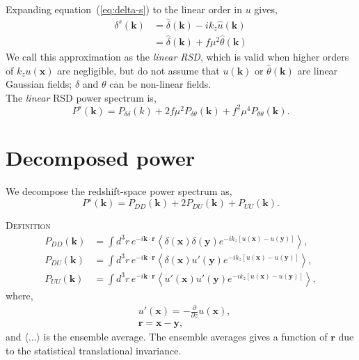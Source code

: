 \documentclass[a4paper,11pt, fleqn]{article}
\begin{document}
Expanding equation~(\ref{eq:delta-s}) to the linear order in $u$ gives,
%
\begin{align}
  \delta^s(\bm{k}) &= \hat{\delta}(\bm{k}) - ik_z \hat{u}(\bm{k})\\
   &= \hat{\delta}(\bm{k}) + f\mu^2 \hat{\theta}(\bm{k})
\end{align}
%
We call this approximation as the \textit{linear RSD}, which is valid
when higher orders of $k_z u(\bm{x})$ are negligible, but do not
assume that $u(\bm{k})$ or $\hat{\theta}(\bm{k})$ are linear Gaussian
fields; $\delta$ and $\theta$ can be non-linear fields.\\

The \textit{linear} RSD power spectrum is,
%
\begin{equation}
  P^s(\bm{k}) = P_{\delta\delta}(k) +
  2f\mu^2 P_{\delta \theta}(\bm{k}) + f^2\mu^4 P_{\theta\theta}(\bm{k}).
\end{equation}


%
%
\newpage
\section{Decomposed power}

We decompose the redshift-space power spectrum as,
%
\begin{equation}
  P^s(\bm{k}) = P_{DD}(\bm{k}) + 2 P_{DU}(\bm{k}) + P_{UU}(\bm{k}).
\end{equation}

\vspace{5mm}
\textsc{Definition}
\vspace{-2mm}
%
\begin{align}
  P_{DD}(\bm{k}) &=
  \int\! d^3 r \, e^{-i \bm{k}\cdot\bm{r}}
  \left\langle
    \delta(\bm{x}) \delta(\bm{y}) e^{-ik_z [u(\bm{x}) - u(\bm{y})]}
    \right\rangle,\\
  P_{DU}(\bm{k}) &=
  \int\! d^3 r \, e^{-i \bm{k}\cdot\bm{r}}
  \left\langle
    \delta(\bm{x}) u'(\bm{y}) e^{-ik_z [u(\bm{x}) - u(\bm{y})]}
    \right\rangle,\\
  P_{UU}(\bm{k}) &=
  \int\! d^3 r \, e^{-i \bm{k}\cdot\bm{r}}
  \left\langle
    u'(\bm{x}) u'(\bm{y}) e^{-ik_z [u(\bm{x}) - u(\bm{y})]}
    \right\rangle,
\end{align}
%
where,
\begin{align}
  &u'(\bm{x}) = - \frac{\partial}{\partial z} u(\bm{x}),\\
  &\bm{r}     = \bm{x} - \bm{y},
\end{align}
%
and $\langle\dots\rangle$ is the ensemble average. The ensemble
averages gives a function of $\bm{r}$ due to the statistical
translational invariance.
\end{document}
